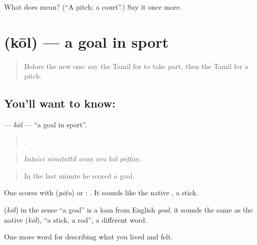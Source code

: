 \begin{tcolorbox}[breakable,colback=teal!4,colframe=teal!35!black,title={Before you move on}]
What does  mean? (\textquotedblleft{}A pitch; a court\textquotedblright{}.) Say it once more.
\end{tcolorbox}
\section[\texorpdfstring{\ta{கோல்} (kōl)}{கோல் (kōl)}]{ (kōl) — a goal in sport}

\label{lesson:TA-C535-kol}



\begin{quote}
Before the new one: say the Tamil for to take part, then the Tamil for a pitch.
\end{quote}

\subsection*{You'll want to know: }
\textbf{} — \emph{kōl} — \textquotedblleft{}a goal in sport\textquotedblright{}.

\begin{quote}
     .
\end{quote}

\begin{quote}
\emph{kaṭaici nimiṭattil avaṉ oru kōl pōṭṭāṉ.}
\end{quote}

\begin{quote}
In the last minute he scored a goal.
\end{quote}

One scores with  (\emph{pōṭu}) or :  . It sounds like the native , a stick.

\begin{cousinweb}
\textbf{} (\emph{kōl}) in the sense \textquotedblleft{}a goal\textquotedblright{} is a loan from English \emph{goal}; it sounds the same as the native  (\emph{kōl}), \textquotedblleft{}a stick, a rod\textquotedblright{}, a different word.
\end{cousinweb}

\begin{grammarlens}[title={What you've built}]
One more word for describing what you lived and felt.
\end{grammarlens}

